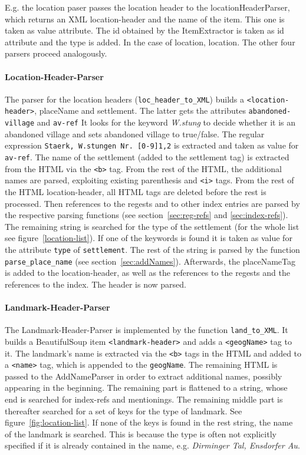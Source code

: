 E.g. the location paser passes the location header to the locationHeaderParser, which returns an XML location-header and the name of the item. This one is taken as value attribute. The id obtained by the ItemExtractor is taken as id attribute and the type is added. In the case of location, location. The other four parsers proceed analogously.

\paragraph{Location-Header-Parser}
The parser for the location headers (\texttt{loc\_header\_to\_XML}) builds a \texttt{<location-header>}, placeName and settlement. The latter gets the attributes \texttt{abandoned-village} and \texttt{av-ref} It looks for the keyword \textit{W.stung} to decide whether it is an abandoned village and sets abandoned village to true/false. The regular expression \texttt{Staerk, W.stungen Nr. [0-9]{1,2}} is extracted and taken as value for \texttt{av-ref}. The name of the settlement (added to the settlement tag) is extracted from the HTML via the \texttt{<b>} tag. From the rest of the HTML, the additional names are parsed, exploiting existing parenthesis and \texttt{<i>} tags. From the rest of the HTML location-header, all HTML tags are deleted before the rest is processed. Then references to the regests and to other index entries are parsed by the respective parsing functions (see section~\ref{sec:reg-refs} and \ref{sec:index-refs}). The remaining string is searched for the type of the settlement (for the whole list see figure~\ref{location-list}). If one of the keywords is found it is taken as value for the attribute \texttt{type} of \texttt{settlement}. The rest of the string is parsed by the function \texttt{parse\_place\_name} (see section~\ref{sec:addNames}). Afterwards, the placeNameTag is added to the location-header, as well as the references to the regests and the references to the index. The header is now parsed.

\paragraph{Landmark-Header-Parser}
The Landmark-Header-Parser is implemented by the function \texttt{land\_to\_XML}. It builds a BeautifulSoup item \texttt{<landmark-header>} and adds a \texttt{<geogName>} tag to it. The landmark's name is extracted via the \texttt{<b>} tags in the HTML and added to a \texttt{<name>} tag, which is appended to the \texttt{geogName}. The remaining HTML is passed to the AddNameParser in order to extract additional names, possibly appearing in the beginning. The remaining part is flattened to a string, whose end is searched for index-refs and mentionings. The remaining middle part is thereafter searched for a set of keys for the type of landmark. See figure~\ref{fig:location-list}. If none of the keys is found in the rest string, the name of the landmark is searched. This is because the type is often not explicitly specified if it is already contained in the name, e.g. \textit{Dirminger Tal, Ensdorfer Au}.

